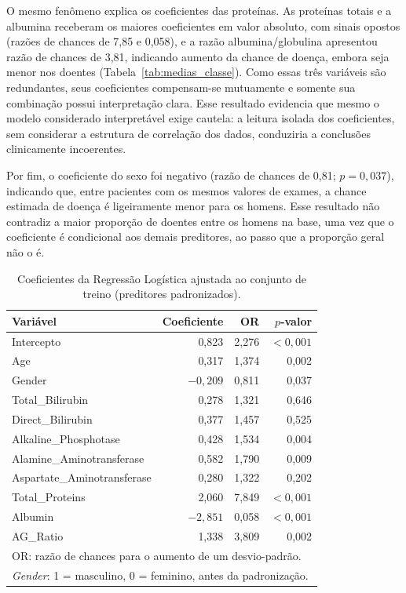 O mesmo fenômeno explica os coeficientes das proteínas. As proteínas totais e a albumina receberam os maiores coeficientes em valor absoluto, com sinais opostos (razões de chances de 7,85 e 0,058), e a razão albumina/globulina apresentou razão de chances de 3,81, indicando aumento da chance de doença, embora seja menor nos doentes (Tabela~\ref{tab:medias_classe}). Como essas três variáveis são redundantes, seus coeficientes compensam-se mutuamente e somente sua combinação possui interpretação clara. Esse resultado evidencia que mesmo o modelo considerado interpretável exige cautela: a leitura isolada dos coeficientes, sem considerar a estrutura de correlação dos dados, conduziria a conclusões clinicamente incoerentes.

Por fim, o coeficiente do sexo foi negativo (razão de chances de 0,81; $p = 0{,}037$), indicando que, entre pacientes com os mesmos valores de exames, a chance estimada de doença é ligeiramente menor para os homens. Esse resultado não contradiz a maior proporção de doentes entre os homens na base, uma vez que o coeficiente é condicional aos demais preditores, ao passo que a proporção geral não o é.

\begin{table}[htbp]
\centering
\begin{tabular}{lrrr}
\hline
\textbf{Variável} & \textbf{Coeficiente} & \textbf{OR} & \textbf{$p$-valor} \\
\hline
Intercepto                  & 0,823  & 2,276 & $<0{,}001$ \\
Age                         & 0,317  & 1,374 & 0,002 \\
Gender                      & $-0{,}209$ & 0,811 & 0,037 \\
Total\_Bilirubin            & 0,278  & 1,321 & 0,646 \\
Direct\_Bilirubin           & 0,377  & 1,457 & 0,525 \\
Alkaline\_Phosphotase       & 0,428  & 1,534 & 0,004 \\
Alamine\_Aminotransferase   & 0,582  & 1,790 & 0,009 \\
Aspartate\_Aminotransferase & 0,280  & 1,322 & 0,202 \\
Total\_Proteins             & 2,060  & 7,849 & $<0{,}001$ \\
Albumin                     & $-2{,}851$ & 0,058 & $<0{,}001$ \\
AG\_Ratio                   & 1,338  & 3,809 & 0,002 \\
\hline
\multicolumn{4}{l}{\footnotesize OR: razão de chances para o aumento de um desvio-padrão.} \\
\multicolumn{4}{l}{\footnotesize \textit{Gender}: 1 = masculino, 0 = feminino, antes da padronização.} \\
\end{tabular}
\caption{Coeficientes da Regressão Logística ajustada ao conjunto de treino (preditores padronizados).}
\label{tab:res_coef_lr}
\end{table}

